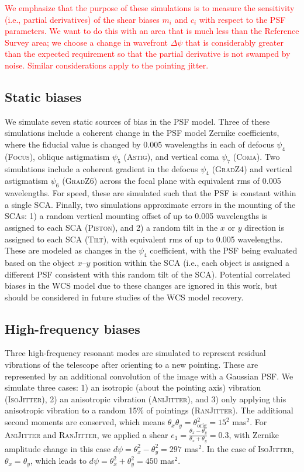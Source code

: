 \documentclass[usenatbib]{mnras}
\newcommand{\changetext}[1]{\textcolor{red}{#1}}
\begin{document}
\changetext{We emphasize that the purpose of these simulations is to measure the sensitivity (i.e., partial derivatives) of the shear biases $m_i$ and $c_i$ with respect to the PSF parameters. We want to do this with an area that is much less than the Reference Survey area; we choose a change in wavefront $\Delta\psi$ that is considerably greater than the expected requirement so that the partial derivative is not swamped by noise. Similar considerations apply to the pointing jitter.}

\subsection{Static biases}\label{sec:static}

We simulate seven static sources of bias in the PSF model. 
Three of these simulations include a coherent change in the PSF model Zernike coefficients, where the fiducial value is changed by 0.005 wavelengths in each of defocus $\psi_4$ (\textsc{Focus}), oblique astigmatism $\psi_5$ (\textsc{Astig}), and vertical coma $\psi_7$ (\textsc{Coma}). 
Two simulations include a coherent gradient in the defocus $\psi_4$ (\textsc{GradZ4}) and vertical astigmatism $\psi_6$ (\textsc{GradZ6}) across the focal plane with equivalent rms of 0.005 wavelengths. 
For speed, these are simulated such that the PSF is constant within a single SCA. Finally, two simulations approximate errors in the mounting of the SCAs: 1) a random vertical mounting offset of up to 0.005 wavelengths is assigned to each SCA (\textsc{Piston}), and 2) a random tilt in the $x$ or $y$ direction is assigned to each SCA  (\textsc{Tilt}), with equivalent rms of up to 0.005 wavelengths. 
These are modeled as changes in the $\psi_4$ coefficient, with the PSF being evaluated based on the object $x$--$y$ position within the SCA (i.e., each object is assigned a different PSF consistent with this random tilt of the SCA). 
Potential correlated biases in the WCS model due to these changes are ignored in this work, but should be considered in future studies of the WCS model recovery.

\subsection{High-frequency biases}\label{sec:low}

Three high-frequency resonant modes are simulated to represent residual vibrations of the telescope after orienting to a new pointing. 
These are represented by an additional convolution of the image with a Gaussian PSF. We simulate three cases: 1) an isotropic (about the pointing axis) vibration  (\textsc{IsoJitter}), 2) an anisotropic vibration (\textsc{AniJitter}), and 3) only applying this anisotropic vibration to a random 15\% of pointings (\textsc{RanJitter}). 
The additional second moments are conserved, which means $\theta_x\theta_y=\theta_{\mathrm{orig}}^2=15^2$ mas$^2$. 
For \textsc{AniJitter} and \textsc{RanJitter}, we applied a shear $e_1=\frac{\theta_x-\theta_y}{\theta_x+\theta_y}=0.3$,  with Zernike amplitude change in this case  $d\psi=\theta_x^2-\theta_y^2=297$ mas$^2$. 
In the case of \textsc{IsoJitter}, $\theta_x=\theta_y$, which leads to $d\psi=\theta_x^2+\theta_y^2=450$ mas$^2$.
\end{document}
